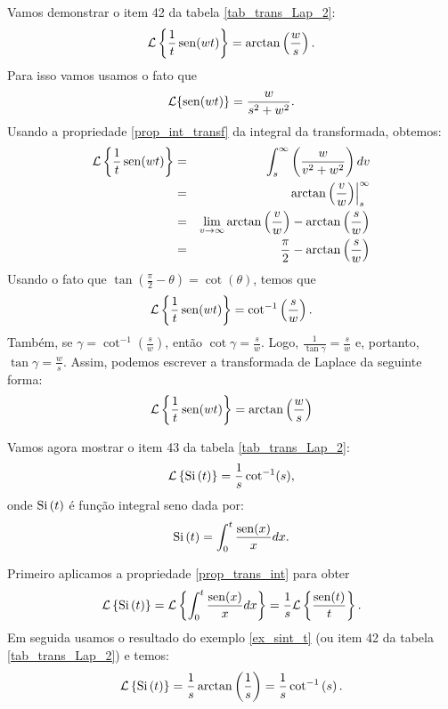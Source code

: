 \documentclass[Main.tex]{subfiles}
\begin{document}
\begin{ex}{\label{ex_sint_t}}Vamos demonstrar o item 42 da tabela \ref{tab_trans_Lap_2}:
$$
\mathcal{L}\left\{\frac{1}{t}\operatorname{sen}(wt)\right\}=\arctan\left(\frac{w}{s}\right).
$$
Para isso vamos usamos o fato que
\begin{equation*}
\mathcal{L}\{\operatorname{sen}(wt)\}=\frac{w}{s^2+w^2}.
\end{equation*}
Usando a propriedade \ref{prop_int_transf} da integral da transformada, obtemos:
\begin{eqnarray*}
\mathcal{L}\left\{\frac{1}{t}\operatorname{sen}(wt)\right\}&=&\int_s^\infty \left(\frac{w}{v^2+w^2}\right)dv\\
&=& \left.\arctan\left(\frac{v}{w}\right)\right|_s^\infty\\
&=&\lim_{v\to\infty}\arctan\left(\frac{v}{w}\right)-\arctan\left(\frac{s}{w}\right)\\
&=&\frac{\pi}{2}-\arctan\left(\frac{s}{w}\right)\\
\end{eqnarray*}
Usando o fato que $\tan\left(\frac{\pi}{2}-\theta\right)=\cot(\theta)$, temos que
\begin{eqnarray*}
\mathcal{L}\left\{\frac{1}{t}\operatorname{sen}(wt)\right\}=\cot^{-1}\left(\frac{s}{w}\right).
\end{eqnarray*}
Também, se $\gamma=\cot^{-1}\left(\frac{s}{w}\right)$, então $\cot\gamma=\frac{s}{w}$. Logo, $\frac{1}{\tan\gamma}=\frac{s}{w}$ e, portanto, $\tan\gamma=\frac{w}{s}$. Assim, podemos escrever a transformada de Laplace da seguinte forma:
\begin{eqnarray*}
\mathcal{L}\left\{\frac{1}{t}\operatorname{sen}(wt)\right\}=\arctan\left(\frac{w}{s}\right)
\end{eqnarray*}
\end{ex}

\begin{ex}Vamos agora mostrar o item 43 da tabela \ref{tab_trans_Lap_2}:
$$
\mathcal{L}\left\{\hbox{Si}\ \!(t)\right\}=\frac{1}{s}\cot^{-1}(s),
$$
onde $\hbox{Si}\ \!(t)$ é função integral seno dada por:
$$
\hbox{Si}\ \!(t)=\int_0^t\frac{\sen(x)}{x}dx.
$$

Primeiro aplicamos a propriedade \ref{prop_trans_int} para obter
$$
\mathcal{L}\left\{\hbox{Si}\ \!(t)\right\}=\mathcal{L}\left\{\int_0^t\frac{\sen(x)}{x}dx\right\}=\frac{1}{s}\mathcal{L}\left\{\frac{\sen(t)}{t}\right\}.
$$
Em seguida usamos o resultado do exemplo \ref{ex_sint_t} (ou item 42 da tabela \ref{tab_trans_Lap_2}) e temos:
$$
\mathcal{L}\left\{\hbox{Si}\ \!(t)\right\}=\frac{1}{s}\arctan\left(\frac{1}{s}\right)=\frac{1}{s}\cot^{-1}\left(s\right).
$$
\end{ex}
\end{document}
